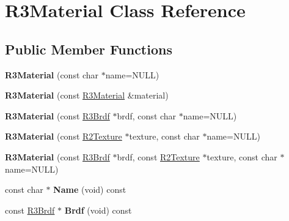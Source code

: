 \hypertarget{class_r3_material}{}\section{R3\+Material Class Reference}
\label{class_r3_material}
\subsection*{Public Member Functions}
\begin{DoxyCompactItemize}
\item 
{\bfseries R3\+Material} (const char $\ast$name=N\+U\+LL)\hypertarget{class_r3_material_a07cc8021d12cd084c709798ac2b1c214}{}\label{class_r3_material_a07cc8021d12cd084c709798ac2b1c214}

\item 
{\bfseries R3\+Material} (const \hyperlink{class_r3_material}{R3\+Material} \&material)\hypertarget{class_r3_material_ace2993b7f61e76a7c53c7038e79a9752}{}\label{class_r3_material_ace2993b7f61e76a7c53c7038e79a9752}

\item 
{\bfseries R3\+Material} (const \hyperlink{class_r3_brdf}{R3\+Brdf} $\ast$brdf, const char $\ast$name=N\+U\+LL)\hypertarget{class_r3_material_a066b8fd2496c45c9fe0c33c077df7cc0}{}\label{class_r3_material_a066b8fd2496c45c9fe0c33c077df7cc0}

\item 
{\bfseries R3\+Material} (const \hyperlink{class_r2_texture}{R2\+Texture} $\ast$texture, const char $\ast$name=N\+U\+LL)\hypertarget{class_r3_material_a05b024ad05df03be1040d1736a295171}{}\label{class_r3_material_a05b024ad05df03be1040d1736a295171}

\item 
{\bfseries R3\+Material} (const \hyperlink{class_r3_brdf}{R3\+Brdf} $\ast$brdf, const \hyperlink{class_r2_texture}{R2\+Texture} $\ast$texture, const char $\ast$name=N\+U\+LL)\hypertarget{class_r3_material_acdcf7f2392e1786bc737de2433946944}{}\label{class_r3_material_acdcf7f2392e1786bc737de2433946944}

\item 
const char $\ast$ {\bfseries Name} (void) const \hypertarget{class_r3_material_a33a317c070cb380e4935e053446596f2}{}\label{class_r3_material_a33a317c070cb380e4935e053446596f2}

\item 
const \hyperlink{class_r3_brdf}{R3\+Brdf} $\ast$ {\bfseries Brdf} (void) const \hypertarget{class_r3_material_a24d172de895eb1e8d155989614a262f5}{}\label{class_r3_material_a24d172de895eb1e8d155989614a262f5}


\end{DoxyCompactItemize}
